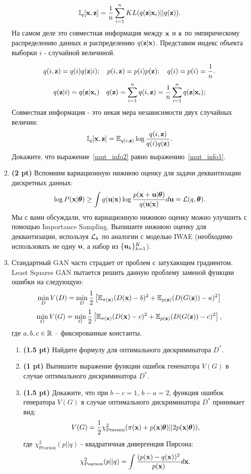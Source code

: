 \documentclass{article}
\begin{document}
\begin{enumerate}
    \begin{equation}
    	\mathbb{I}_{q} [\mathbf{x}, \mathbf{z}] = \frac{1}{n}\sum_{i=1}^n KL(q(\mathbf{z} | \mathbf{x}_i) || q (\mathbf{z})).
	   	 \label{mut_info1}
    \end{equation}
    На самом деле это совместная информация между $\mathbf{x}$ и $\mathbf{z}$ по эмпирическому распределению данных и распределению $q(\mathbf{z} | \mathbf{x})$. Представим индекс объекта выборки $i$ - случайной величиной.
    
    \[
        q(i, \mathbf{z}) = q(i) q(\mathbf{z} | i); \quad p(i, \mathbf{z}) = p(i) p(\mathbf{z}); \quad 
        q(i) = p(i) = \frac{1}{n}.
    \]
    \[
    	 \quad q(\mathbf{z} | i) = q(\mathbf{z} | \mathbf{x}_i) \quad q(\mathbf{z}) = \sum_{i=1}^n q(i, \mathbf{z}) = \frac{1}{n} \sum_{i=1}^n q(\mathbf{z} | \mathbf{x}_i); \quad  
    \]
    Совместная информация - это некая мера независимости двух случайных величин:
    \begin{equation}
	   	 \mathbb{I}_{q} [\mathbf{x}, \mathbf{z}] = \mathbb{E}_{q(i, \mathbf{z})} \log \frac{q(i, \mathbf{z})}{q(i)q(\mathbf{z})}.
	   	 \label{mut_info2}
    \end{equation}
    Докажите, что выражение~\eqref{mut_info2} равно выражению~\eqref{mut_info1}.
    
    \item  \textbf{(2 pt)} Вспомним вариационную нижнюю оценку для задачи деквантизации дискретных данных:
    \[
     	\log P(\mathbf{x} | \boldsymbol{\theta}) \geq  \int q(\mathbf{u} | \mathbf{x}) \log \frac{p(\mathbf{x} + \mathbf{u} | \boldsymbol{\theta})}{q(\mathbf{u} | \mathbf{x})} d \mathbf{u} = \mathcal{L}(q, \boldsymbol{\theta}).
    \]
    Мы с вами обсуждали, что вариационную нижнюю оценку можно улучшить с помощью Importance Sampling. Выпишите нижнюю оценку для деквантизации, используя $\mathcal{L}_k$ по аналогии с моделью IWAE (необходимо использовать не одну $\mathbf{u}$, а набор из $\{\mathbf{u}_k\}_{k=1}^K$).
    
   	\item Стандартный GAN часто страдает от проблем с затухающим градиентом. Least Squares GAN пытается решить данную проблему заменой функции ошибки на следующую:
   	\[
   		\min_D V(D) = \min_D \frac{1}{2}\left[ \mathbb{E}_{\pi(\mathbf{x})} (D(\mathbf{x}) - b)^2 + \mathbb{E}_{p(\mathbf{z})} (D(G(\mathbf{z})) - a)^2 \right]
   	\]
   	\[
   		\min_G V(G) = \min_G \frac{1}{2}\left[ \mathbb{E}_{\pi(\mathbf{x})} (D(\mathbf{x}) - c)^2 + \mathbb{E}_{p(\mathbf{z})} (D(G(\mathbf{z})) - c)^2 \right],
   	\]
   	где $a,b,c \in \mathbb{R}$ -- фиксированные константы.
   	\begin{enumerate}
   		\item  \textbf{(1.5 pt)} Найдите формулу для оптимального дискриминатора $D^*$.
   		\item  \textbf{(1 pt)} Выпишите выражение функции ошибок гененатора $V(G)$ в случае оптимального дискриминатора $D^*$.
   		\item  \textbf{(1.5 pt)} Докажите, что при $b - c = 1$, $b - a = 2$, функция ошибок генератора $V(G)$ в случае оптимального дискриминатора $D^*$ принимает вид:
   		\[
   			V(G) = \frac{1}{2} \chi^2_{\text{Pearson}} (\pi(\mathbf{x}) + p(\mathbf{x} | \boldsymbol{\theta}) || 2 p(\mathbf{x} | \boldsymbol{\theta})), 
   		\]
   		где $\chi^2_{\text{Pearson}} (p || q)$ - квадратичная дивергенция Пирсона:
   		\[
   			\chi^2_{\text{Pearson}} (p || q) = \int \frac{(p(\mathbf{x}) - q(\mathbf{x}))^2}{p(\mathbf{x})} d \mathbf{x}.
   		\]
   	\end{enumerate}
\end{enumerate}
\end{document}
